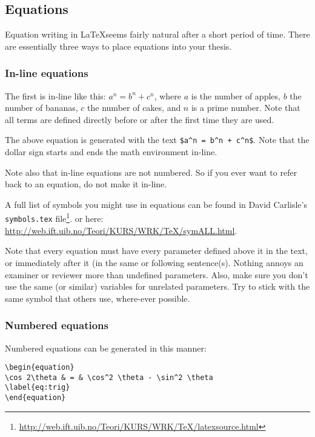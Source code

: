 \subsection{Equations}
\label{sec:equations}
Equation writing in \LaTeX seems fairly natural after a short period of time.
There are essentially three ways to place equations into your thesis. 

\subsubsection{In-line equations}
The first is in-line like this: $a^n = b^n + c^n$, where $a$ is the 
number of apples, $b$ the number of bananas,
$c$ the number of cakes, and $n$ is a prime number. 
Note that all terms are defined directly before or after the first time they are used.

The above equation is generated with the text \verb|$a^n = b^n + c^n$|.
Note that the dollar sign starts and ends the math environment in-line.

Note also that in-line equations are not numbered. 
So if you ever want to refer back to an equation, do not make it in-line.

A full list of symbols you might use in equations can be found in
David Carlisle's \verb|symbols.tex| 
file\footnote{\url{http://web.ift.uib.no/Teori/KURS/WRK/TeX/latexsource.html}}.
or here: \newline
\url{http://web.ift.uib.no/Teori/KURS/WRK/TeX/symALL.html}.

Note that every equation must have every parameter defined above it in the text, or immediately after it (in the same or following sentence(s). Nothing annoys an examiner or reviewer more than undefined parameters. Also, make sure you don't use the same (or similar) variables for unrelated parameters. Try to stick with the same symbol that others use, where-ever possible. 

\subsubsection{Numbered equations}

Numbered equations can be generated in this manner:
\begin{verbatim}
\begin{equation}
\cos 2\theta & = & \cos^2 \theta - \sin^2 \theta 
\label{eq:trig}
\end{equation}
\end{verbatim}

